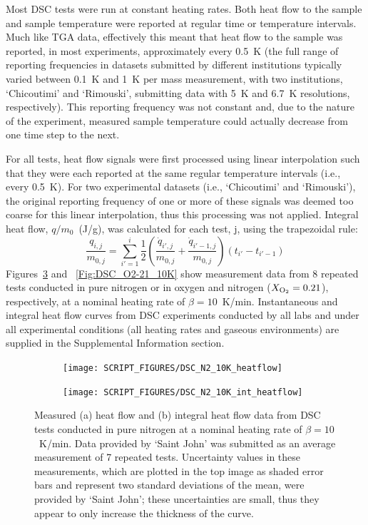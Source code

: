 \documentclass{book}
\begin{document}
Most DSC tests were run at constant heating rates. Both heat flow to the sample and sample temperature were reported at regular time or temperature intervals. Much like TGA data, effectively this meant that heat flow to the sample was reported, in most experiments, approximately every 0.5~K (the full range of reporting frequencies in datasets submitted by different institutions typically varied between 0.1~K and 1~K per mass measurement, with two institutions, ‘Chicoutimi’ and ‘Rimouski’, submitting data with 5~K and 6.7~K resolutions, respectively). This reporting frequency was not constant and, due to the nature of the experiment, measured sample temperature could actually decrease from one time step to the next.

For all tests, heat flow signals were first processed using linear interpolation such that they were each reported at the same regular temperature intervals (i.e., every 0.5~K). For two experimental datasets (i.e., ‘Chicoutimi’ and ‘Rimouski’), the original reporting frequency of one or more of these signals was deemed too coarse for this linear interpolation, thus this processing was not applied. Integral heat flow, $q/m_0$~(J/g), was calculated for each test, j, using the trapezoidal rule:
\begin{equation}
\frac{q_{i,j}}{m_{0,j}} = \sum_{i'=1}^i \frac{1}{2} \left( \frac{\dot{q}_{i',j}}{m_{0,j}} + \frac{\dot{q}_{i'-1,j}}{m_{0,j}} \right) \left(t_{i'}-t_{i'-1} \right)
\end{equation}
Figures~\ref{Fig:DSC_N2_10K} and ~\ref{Fig:DSC_O2-21_10K} show measurement data from 8 repeated tests conducted in pure nitrogen or in oxygen and nitrogen ($X_{\rm O_2}=0.21$), respectively, at a nominal heating rate of $\beta=10$~K/min. Instantaneous and integral heat flow curves from DSC experiments conducted by all labs and under all experimental conditions (all heating rates and gaseous environments) are supplied in the Supplemental Information section.

\begin{figure} [p]
\centering
\begin{subfigure}[b]{0.85\textwidth}
   \texttt{[image: SCRIPT\_FIGURES/DSC\_N2\_10K\_heatflow]}
   \caption{}
   \label{Fig:DSC_N2_10K_heatflow}
\end{subfigure}

\begin{subfigure}[b]{0.85\textwidth}
   \texttt{[image: SCRIPT\_FIGURES/DSC\_N2\_10K\_int\_heatflow]}
   \caption{}
   \label{Fig:DSC_N2_10K_int_heatflow}
\end{subfigure}

  \caption{Measured (a) heat flow and (b) integral heat flow data from DSC tests conducted in pure nitrogen at a nominal heating rate of $\beta=10$~K/min. Data provided by `Saint John' was submitted as an average measurement of 7 repeated tests. Uncertainty values in these measurements, which are plotted in the top image as shaded error bars and represent two standard deviations of the mean, were provided by ‘Saint John’; these uncertainties are small, thus they appear to only increase the thickness of the curve.}
  \label{Fig:DSC_N2_10K}
\end{figure}
\end{document}
